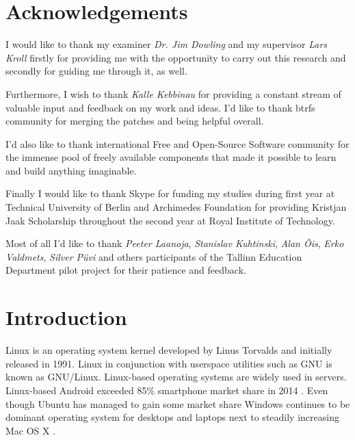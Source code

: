 \documentclass[a4paper,11pt]{kth-mag}
\begin{document}
\chapter*{Acknowledgements}

I would like to thank my examiner \emph{Dr. Jim Dowling} and my supervisor \emph{Lars Kroll} firstly for providing me with the opportunity to carry out this research and secondly for guiding me through it, as well.

Furthermore, I wish to thank \emph{Kalle Kebbinau} for providing a constant
stream of valuable input and feedback on my work and ideas.
I'd like to thank \acrshort{btrfs} community for merging the patches and being helpful overall.

I'd also like to thank international Free and Open-Source Software community
for the immense pool of freely available components that made it possible
to learn and build anything imaginable.

Finally I would like to thank Skype for funding my studies during first year
at Technical University of Berlin and
Archimedes Foundation for providing
Kristjan Jaak Scholarship throughout the
second year at Royal Institute of Technology.

Most of all I'd like to thank 
\emph{Peeter Laanoja},
\emph{Stanislav Kuhtinski},
\emph{Alan Õis},
\emph{Erko Valdmets},
\emph{Silver Püvi} and others participants
of the Tallinn Education Department pilot project
for their patience and feedback.

\clearpage
\tableofcontents*
\mainmatter
\pagestyle{newchap}
\clearpage

%
%
%
%

\chapter{Introduction}
\label{chap:intro}

Linux is an operating system kernel
developed by Linus Torvalds \cite{linux-a-portable-operating-system}
and initially released in 1991.
Linux in conjunction with userspace utilities
such as GNU \cite{free-software-free-society} is known as GNU/Linux.
Linux-based operating systems are widely used in servers.
Linux-based Android exceeded 85\% smartphone
market share in 2014
\cite{android-market-share}.
Even though Ubuntu has managed to gain some market share
Windows continues to be dominant operating system for desktops
and laptops next to steadily increasing Mac OS X
\cite{desktop-market-share}.
\end{document}
